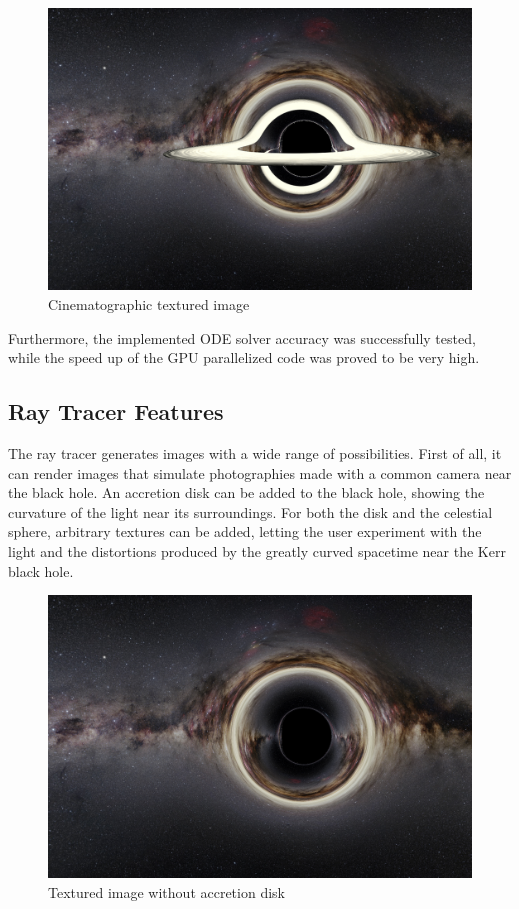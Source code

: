 \begin{figure}[bth]
	\myfloatalign
	\includegraphics[width=\linewidth]{gfx/bh_texture_disk}
	\caption[Cinematographic textured image]{Cinematographic textured image}
	\label{fig:blackhole}
\end{figure}

Furthermore, the implemented \ac{ODE} solver accuracy was successfully tested, while the speed up of the \ac{GPU} parallelized code was proved to be very high.

\subsection{Ray Tracer Features}

The ray tracer generates images with a wide range of possibilities. First of all, it can render images that simulate photographies made with a common camera near the black hole. An accretion disk can be added to the black hole, showing the curvature of the light near its surroundings. For both the disk and the celestial sphere, arbitrary textures can be added, letting the user experiment with the light and the distortions produced by the greatly curved spacetime near the Kerr black hole.

\begin{figure}[bth]
	\myfloatalign
	\includegraphics[width=\linewidth]{gfx/bh_texture_nodisk}
	\caption[Textured image without accretion disk]{Textured image without accretion disk}
	\label{fig:blackholenodisk}
\end{figure}

